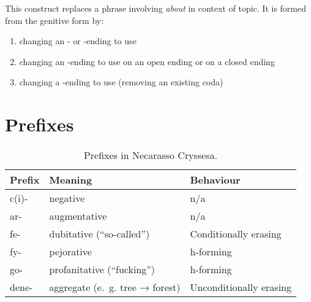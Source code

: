 \documentclass{book}
\begin{document}
This construct replaces a phrase involving  \emph{about} in context of topic. It is formed from the genitive form by:

\begin{enumerate}
  \item changing an - or -ending to use 
  \item changing an -ending to use  on an open ending or  on a closed ending
  \item changing a -ending to use  (removing an existing coda)
\end{enumerate}

\section{Prefixes}

\begin{table}[h]
  \caption{Prefixes in Necarasso Cryssesa.}
  \centering
	\begin{tabular}{|l|l|l|}
		\hline
		Prefix & Meaning & Behaviour \\ \hline
		c(i)- & negative & n/a \\
		ar- & augmentative & n/a \\
		fe- & dubitative (``so-called'') & Conditionally erasing \\
		fy- & pejorative & h-forming \\
		go- & profanitative (``fucking'') & h-forming \\
		dene- & aggregate (e.~g. tree → forest) & Unconditionally erasing \\
		\hline
	\end{tabular}
\end{table}
\end{document}
